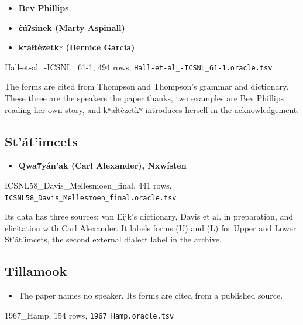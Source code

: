 \begin{itemize}
\item \textbf{Bev Phillips}
\item \textbf{c̓úʔsinek (Marty Aspinall)}
\item \textbf{kʷaɬtèzetkʷ (Bernice Garcia)}
\end{itemize}

Hall-et-al\_-ICSNL\_61-1, 494 rows, \texttt{Hall-\allowbreak{}et-\allowbreak{}al\_\allowbreak{}-\allowbreak{}ICSNL\_\allowbreak{}61-\allowbreak{}1.\allowbreak{}oracle.\allowbreak{}tsv}

The forms are cited from Thompson and Thompson's grammar and dictionary. These three are the speakers the paper thanks, two examples are Bev Phillips reading her own story, and kʷaɬtèzetkʷ introduces herself in the acknowledgement.

\subsection{St'át'imcets}

\begin{itemize}
\item \textbf{Qwa7yán'ak (Carl Alexander), Nxwísten}
\end{itemize}

ICSNL58\_Davis\_Mellesmoen\_final, 441 rows, \texttt{ICSNL58\_\allowbreak{}Davis\_\allowbreak{}Mellesmoen\_\allowbreak{}final.\allowbreak{}oracle.\allowbreak{}tsv}

Its data has three sources: van Eijk's dictionary, Davis et al. in preparation, and elicitation with Carl Alexander. It labels forms (U) and (L) for Upper and Lower St'át'imcets, the second external dialect label in the archive.

\subsection{Tillamook}

\begin{itemize}
\item The paper names no speaker. Its forms are cited from a published source.
\end{itemize}

1967\_Hamp, 154 rows, \texttt{1967\_\allowbreak{}Hamp.\allowbreak{}oracle.\allowbreak{}tsv}

